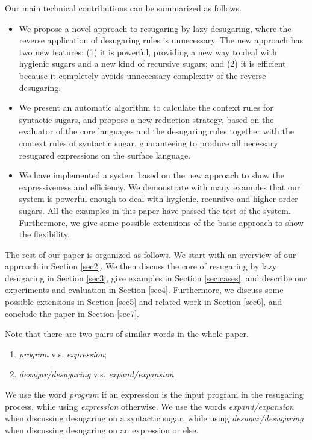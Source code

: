 Our main technical contributions can be summarized as follows.
\begin{itemize}
\item We propose a novel approach to resugaring by lazy desugaring, where the reverse application of desugaring rules is unnecessary. The new approach has two new features: (1) it is powerful, providing a new way to deal with hygienic sugars and a new kind of recursive sugars; and (2) it is efficient because it completely avoids unnecessary complexity of the reverse desugaring.

\item We present an automatic algorithm to calculate the context rules for syntactic sugars, and propose a new reduction strategy, based on the evaluator of the core languages and the desugaring rules together with the context rules of syntactic sugar, guaranteeing to produce all necessary resugared expressions on the surface language.

\item We have implemented a system based on the new approach to show the expressiveness and efficiency. We demonstrate with many examples that our system is powerful enough to deal with hygienic, recursive and higher-order sugars. All the examples in this paper have passed the test of the system. Furthermore, we give some possible extensions of the basic approach to show the flexibility.


\end{itemize}

The rest of our paper is organized as follows. We start with an overview of our approach in Section \ref{sec2}. We then discuss the core of resugaring by lazy desugaring in Section \ref{sec3}, give examples in Section \ref{sec:cases}, and describe our experiments and evaluation in Section \ref{sec4}. Furthermore, we discuss some possible extensions in Section \ref{sec5} and related work in Section \ref{sec6}, and conclude the paper in Section \ref{sec7}.

Note that there are two pairs of similar words in the whole paper.
\begin{enumerate}
	\item \emph{program} v.s. \emph{expression};
	\item \emph{desugar/desugaring} v.s. \emph{expand/expansion}.
\end{enumerate}
We use the word \emph{program} if an expression is the input program in the  resugaring process, while using \emph{expression} otherwise. We use the words \emph{expand/expansion} when discussing desugaring on a syntactic sugar, while using \emph{desugar/desugaring} when discussing desugaring on an expression or else.
